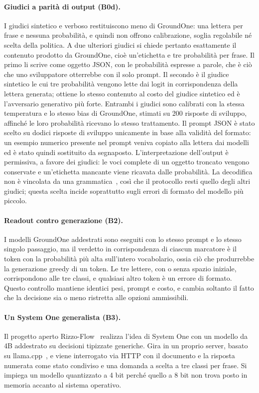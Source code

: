 \paragraph{Giudici a parità di output (B0d).} I giudici sintetico e verboso restituiscono meno di GroundOne: una lettera
per frase e nessuna probabilità, e quindi non offrono calibrazione, soglia regolabile né scelta della politica. A due
ulteriori giudici si chiede pertanto esattamente il contenuto prodotto da GroundOne, cioè un'etichetta e tre probabilità
per frase. Il primo li scrive come oggetto JSON, con le probabilità espresse a parole, che è ciò che uno sviluppatore
otterrebbe con il solo prompt. Il secondo è il giudice sintetico le cui tre probabilità vengono lette dai logit in
corrispondenza della lettera generata; ottiene lo stesso contenuto al costo del giudice sintetico ed è l'avversario
generativo più forte. Entrambi i giudici sono calibrati con la stessa temperatura e lo stesso bias di GroundOne, stimati
su 200 risposte di sviluppo, affinché le loro probabilità ricevano lo stesso trattamento. Il prompt JSON è stato scelto su
dodici risposte di sviluppo unicamente in base alla validità del formato: un esempio numerico presente nel prompt veniva
copiato alla lettera dai modelli ed è stato quindi sostituito da segnaposto. L'interpretazione dell'output è permissiva, a
favore dei giudici: le voci complete di un oggetto troncato vengono conservate e un'etichetta mancante viene ricavata
dalle probabilità. La decodifica non è vincolata da una grammatica~\cite{willard2023outlines}, così che il protocollo
resti quello degli altri giudici; questa scelta incide soprattutto sugli errori di formato del modello più piccolo.

\paragraph{Readout contro generazione (B2).} I modelli GroundOne addestrati sono eseguiti con lo stesso prompt e lo
stesso singolo passaggio, ma il verdetto in corrispondenza di ciascun marcatore è il token con la probabilità più alta
sull'intero vocabolario, ossia ciò che produrrebbe la generazione greedy di un token. Le tre lettere, con o senza spazio
iniziale, corrispondono alle tre classi, e qualsiasi altro token è un errore di formato. Questo controllo mantiene
identici pesi, prompt e costo, e cambia soltanto il fatto che la decisione sia o meno ristretta alle opzioni ammissibili.

\paragraph{Un System One generalista (B3).} Il progetto aperto Rizzo-Flow~\cite{rizzoflow} realizza l'idea di System One
con un modello da 4B addestrato su decisioni tipizzate generiche. Gira in un proprio server, basato su
llama.cpp~\cite{llamacpp}, e viene interrogato via HTTP con il documento e la risposta numerata come stato condiviso e una
domanda a scelta a tre classi per frase. Si impiega un modello quantizzato a 4 bit perché quello a 8 bit non trova posto
in memoria accanto al sistema operativo.

